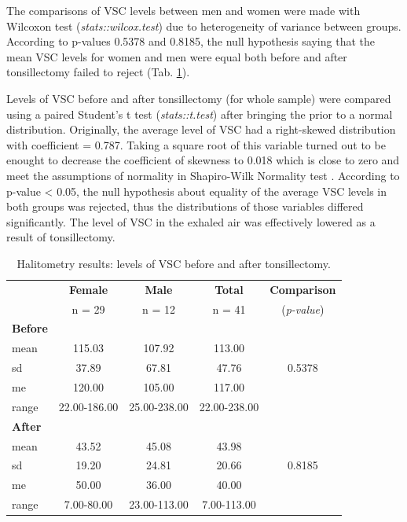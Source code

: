 \documentclass[12pt,a4paper,notitlepage]{report}
\begin{document}
The comparisons of VSC levels between men and women were made with Wilcoxon test (\textit{stats::wilcox.test}) due to heterogeneity of variance between groups. According to p-values 0.5378 and 0.8185, the null hypothesis saying that the mean VSC levels for women and men were equal both before and after tonsillectomy failed to reject (Tab. \ref{tab:Halitometry_results}). 

Levels of VSC before and after tonsillectomy (for whole sample) were compared using a paired Student's t test (\textit{stats::t.test}) after bringing the prior to a normal distribution. Originally, the average level of VSC had a right-skewed distribution with coefficient  = 0.787. Taking a square root of this variable turned out to be enought to decrease the coefficient of skewness to 0.018 which is close to zero and meet the assumptions of normality in Shapiro-Wilk Normality test \cite{Wilcox18}.
According to p-value < 0.05, the null hypothesis about equality of the average VSC levels in both groups was rejected, thus the distributions of those variables differed significantly. The level of VSC in the exhaled air was effectively lowered as a result of tonsillectomy.

\begin{table}[H]
\centering
	\begin{tabular}{lcccc}
	\hline 					& \textbf{Female} & \textbf{Male}	& \textbf{Total} 	&  \textbf{Comparison}  \\
	 				 		& n = 29 			& n = 12		& n = 41			&  (\textit{p-value}) \\
	\hline
	\hline
	\bf{Before}				&				&			&				&		\\
	\indent mean				& 115.03			& 107.92		& 113.00			& 		\\
	\indent sd					& 37.89			& 67.81		& 47.76			& 0.5378 \\
	\indent me				& 120.00			& 105.00		& 117.00			& 		\\
	\indent range				& 22.00-186.00 	& 25.00-238.00	 & 22.00-238.00	& 		\\
	\hline
	
	\bf{After}					&				&			&				&		\\
	\indent mean				& 43.52			& 45.08		& 43.98			& 		\\
	\indent sd					& 19.20			& 24.81		& 20.66			& 0.8185 \\
	\indent me				& 50.00			& 36.00		& 40.00 			& 		\\
	\indent range				& 7.00-80.00	 	& 23.00-113.00	& 7.00-113.00		& 		\\
	\hline
	
	\end{tabular} \\ 
	\caption{Halitometry results: levels of VSC before and after tonsillectomy.}
	\label{tab:Halitometry_results}
\end{table}
\end{document}
